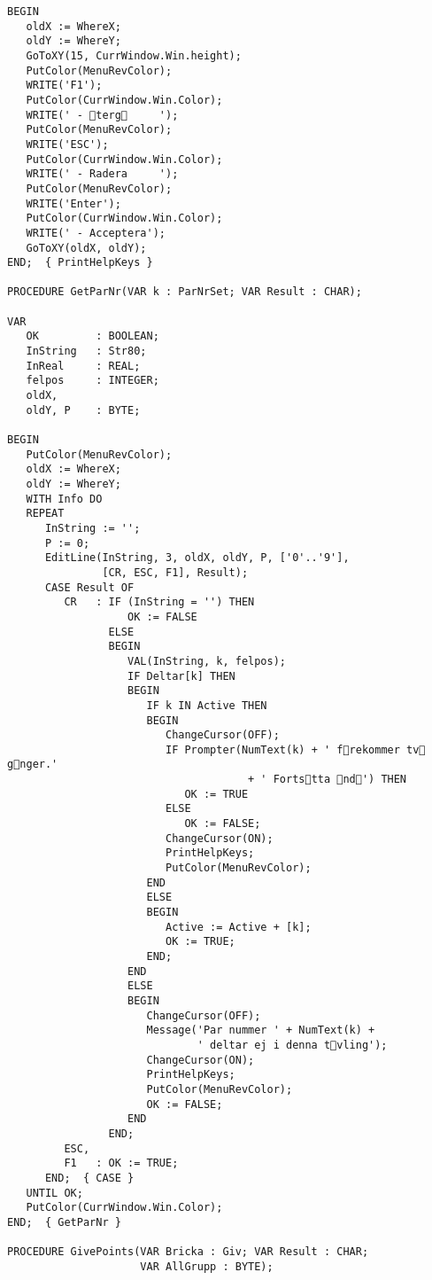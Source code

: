 \begin{verbatim}
BEGIN
   oldX := WhereX;
   oldY := WhereY;
   GoToXY(15, CurrWindow.Win.height);
   PutColor(MenuRevColor);
   WRITE('F1');
   PutColor(CurrWindow.Win.Color);
   WRITE(' - terg     ');
   PutColor(MenuRevColor);
   WRITE('ESC');
   PutColor(CurrWindow.Win.Color);
   WRITE(' - Radera     ');
   PutColor(MenuRevColor);
   WRITE('Enter');
   PutColor(CurrWindow.Win.Color);
   WRITE(' - Acceptera');
   GoToXY(oldX, oldY);
END;  { PrintHelpKeys }

PROCEDURE GetParNr(VAR k : ParNrSet; VAR Result : CHAR);

VAR
   OK         : BOOLEAN;
   InString   : Str80;
   InReal     : REAL;
   felpos     : INTEGER;
   oldX,
   oldY, P    : BYTE;

BEGIN
   PutColor(MenuRevColor);
   oldX := WhereX;
   oldY := WhereY;
   WITH Info DO
   REPEAT
      InString := '';
      P := 0;
      EditLine(InString, 3, oldX, oldY, P, ['0'..'9'],
               [CR, ESC, F1], Result);
      CASE Result OF
         CR   : IF (InString = '') THEN
                   OK := FALSE
                ELSE
                BEGIN
                   VAL(InString, k, felpos);
                   IF Deltar[k] THEN
                   BEGIN
                      IF k IN Active THEN
                      BEGIN
                         ChangeCursor(OFF);
                         IF Prompter(NumText(k) + ' frekommer tv gnger.'
                                      + ' Fortstta nd') THEN
                            OK := TRUE
                         ELSE
                            OK := FALSE;
                         ChangeCursor(ON);
                         PrintHelpKeys;
                         PutColor(MenuRevColor);
                      END
                      ELSE
                      BEGIN
                         Active := Active + [k];
                         OK := TRUE;
                      END;
                   END
                   ELSE
                   BEGIN
                      ChangeCursor(OFF);
                      Message('Par nummer ' + NumText(k) +
                              ' deltar ej i denna tvling');
                      ChangeCursor(ON);
                      PrintHelpKeys;
                      PutColor(MenuRevColor);
                      OK := FALSE;
                   END
                END;
         ESC,
         F1   : OK := TRUE;
      END;  { CASE }
   UNTIL OK;
   PutColor(CurrWindow.Win.Color);
END;  { GetParNr }

PROCEDURE GivePoints(VAR Bricka : Giv; VAR Result : CHAR;
                     VAR AllGrupp : BYTE);


\end{verbatim}
